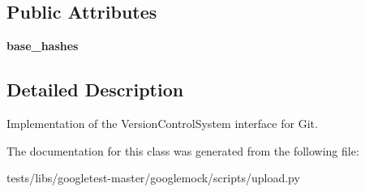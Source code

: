 \subsection*{Public Attributes}
\begin{DoxyCompactItemize}
\item 
\mbox{\label{classtests_1_1libs_1_1googletest-master_1_1googlemock_1_1scripts_1_1upload_1_1GitVCS_a99d9c585922e3c1ce339159f21f877fe}} 
{\bfseries base\+\_\+hashes}
\end{DoxyCompactItemize}


\subsection{Detailed Description}
\begin{DoxyVerb}Implementation of the VersionControlSystem interface for Git.\end{DoxyVerb}
 

The documentation for this class was generated from the following file\+:\begin{DoxyCompactItemize}
\item 
tests/libs/googletest-\/master/googlemock/scripts/upload.\+py\end{DoxyCompactItemize}
